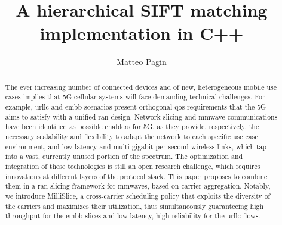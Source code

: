 \documentclass[a4paper, 11pt, oneside]{article}
\begin{document}
\title{\huge A hierarchical SIFT matching \\ implementation in C++} 
\author[1]{\Large Matteo Pagin}

\maketitle

\thispagestyle{empty}

\begin{abstract}
  The ever increasing number of connected devices and of new, heterogeneous mobile use cases implies that 5G cellular systems will face demanding technical challenges. For example, \gls{urllc} and \gls{embb} scenarios present orthogonal \gls{qos} requirements that the 5G aims to satisfy with a unified \gls{ran} design. Network slicing and \gls{mmwave} communications have been identified as possible enablers for 5G, as they provide, respectively, the necessary scalability and flexibility to adapt the network to each specific use case environment, and low latency and multi-gigabit-per-second wireless links, which tap into a vast, currently unused portion of the spectrum.
  The optimization and integration of these technologies is still an open research challenge, which requires innovations at different layers of the protocol stack. This paper proposes to combine them in a \gls{ran} slicing framework for \glspl{mmwave}, based on carrier aggregation. Notably, we introduce MilliSlice, a cross-carrier scheduling policy that exploits the diversity of the carriers and maximizes their utilization, thus simultaneously guaranteeing high throughput for the \gls{embb} slices and low latency, high reliability for the \gls{urllc} flows.
\end{abstract}
\end{document}
